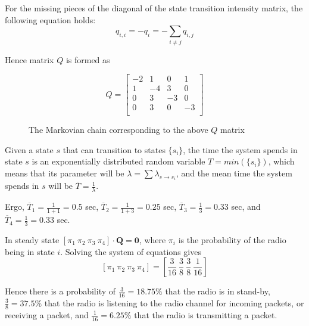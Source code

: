 For the missing pieces of the diagonal of the state transition intensity matrix,
the following equation holds:
$$q_{i,i} = -q_i = -\sum_{i \neq j} q_{i,j}$$

Hence matrix $Q$ is formed as

\begin{equation*}
  Q =
  \begin{bmatrix}
    -2  & 1   & 0   & 1   \\
    1   & -4  & 3   & 0   \\
    0   & 3   & -3  & 0   \\
    0   & 3   & 0   & -3  \\
  \end{bmatrix}
\end{equation*}

\begin{figure}[H]
	\centering
	\scalebox{1}{}
	\caption{The Markovian chain corresponding to the above $Q$ matrix}
\end{figure}

Given a state $s$ that can transition to states $\{s_i\}$, the time the
system spends in state $s$ is an exponentially distributed random variable
$T = min(\{s_i\})$, which means that its parameter will be
$\lambda = \sum \lambda_{s \rightarrow s_i}$, and the mean time the system
spends in $s$ will be $\overline{T} = \frac{1}{\lambda}$.

Ergo, $\overline{T}_1 = \frac{1}{1+1} = 0.5$ sec,
$\overline{T}_2 = \frac{1}{1+3} = 0.25$ sec,
$\overline{T}_3 = \frac{1}{3} = 0.33$ sec, and
$\overline{T}_4 = \frac{1}{3} = 0.33$ sec.


In steady state $[\pi_1\ \pi_2\ \pi_3\ \pi_4] \cdot \mathbf{Q} = \mathbf{0}$,
where $\pi_i$ is the probability of the radio being in state $i$. Solving the
system of equations gives
$$[\pi_1\ \pi_2\ \pi_3\ \pi_4] = [\frac{3}{16}\ \frac{3}{8}\ \frac{3}{8}\ \frac{1}{16}]$$

Hence there is a probability of $\frac{3}{16}=18.75\%$ that the radio is in
stand-by, $\frac{3}{8}=37.5\%$ that the radio is listening to the radio channel
for incoming packets, or receiving a packet, and $\frac{1}{16} = 6.25\%$ that
the radio is transmitting a packet.
